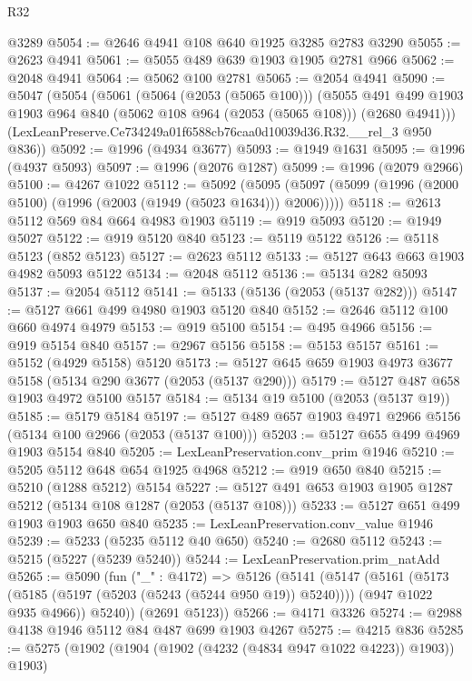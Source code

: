 \begin{lexlean}{R32}
\begin{coremodule}
    @3289
@5054 := @2646 @4941 @108 @640 @1925 @3285 @2783 @3290
@5055 := @2623 @4941
@5061 := @5055 @489 @639 @1903 @1905 @2781 @966
@5062 := @2048 @4941
@5064 := @5062 @100 @2781
@5065 := @2054 @4941
@5090 := @5047
    (@5054
      (@5061
        (@5064 (@2053 (@5065 @100)))
        (@5055
          @491
          @499
          @1903
          @1903
          @964
          @840
          (@5062 @108 @964 (@2053 (@5065 @108)))
          (@2680 @4941)))
      (LexLeanPreserve.Ce734249a01f6588cb76caa0d10039d36.R32.__rel_3 @950 @836))
@5092 := @1996 (@4934 @3677)
@5093 := @1949 @1631
@5095 := @1996 (@4937 @5093)
@5097 := @1996 (@2076 @1287)
@5099 := @1996 (@2079 @2966)
@5100 := @4267 @1022
@5112 := @5092
    (@5095 (@5097 (@5099 (@1996 (@2000 @5100) (@1996 (@2003 (@1949 (@5023 @1634))) @2006)))))
@5118 := @2613 @5112 @569 @84 @664 @4983 @1903
@5119 := @919 @5093
@5120 := @1949 @5027
@5122 := @919 @5120 @840
@5123 := @5119 @5122
@5126 := @5118 @5123 (@852 @5123)
@5127 := @2623 @5112
@5133 := @5127 @643 @663 @1903 @4982 @5093 @5122
@5134 := @2048 @5112
@5136 := @5134 @282 @5093
@5137 := @2054 @5112
@5141 := @5133 (@5136 (@2053 (@5137 @282)))
@5147 := @5127 @661 @499 @4980 @1903 @5120 @840
@5152 := @2646 @5112 @100 @660 @4974 @4979
@5153 := @919 @5100
@5154 := @495 @4966
@5156 := @919 @5154 @840
@5157 := @2967 @5156
@5158 := @5153 @5157
@5161 := @5152 (@4929 @5158) @5120
@5173 := @5127 @645 @659 @1903 @4973 @3677 @5158 (@5134 @290 @3677 (@2053 (@5137 @290)))
@5179 := @5127 @487 @658 @1903 @4972 @5100 @5157
@5184 := @5134 @19 @5100 (@2053 (@5137 @19))
@5185 := @5179 @5184
@5197 := @5127 @489 @657 @1903 @4971 @2966 @5156 (@5134 @100 @2966 (@2053 (@5137 @100)))
@5203 := @5127 @655 @499 @4969 @1903 @5154 @840
@5205 := LexLeanPreservation.conv_prim @1946
@5210 := @5205 @5112 @648 @654 @1925 @4968
@5212 := @919 @650 @840
@5215 := @5210 (@1288 @5212) @5154
@5227 := @5127 @491 @653 @1903 @1905 @1287 @5212 (@5134 @108 @1287 (@2053 (@5137 @108)))
@5233 := @5127 @651 @499 @1903 @1903 @650 @840
@5235 := LexLeanPreservation.conv_value @1946
@5239 := @5233 (@5235 @5112 @40 @650)
@5240 := @2680 @5112
@5243 := @5215 (@5227 (@5239 @5240))
@5244 := LexLeanPreservation.prim_natAdd
@5265 := @5090
    (fun ("_" : @4172) =>
    @5126
      (@5141
        (@5147
          (@5161
            (@5173 (@5185 (@5197 (@5203 (@5243 (@5244 @950 @19)) @5240))))
            (@947 @1022 @935 @4966))
          @5240))
      (@2691 @5123))
@5266 := @4171 @3326
@5274 := @2988 @4138 @1946 @5112 @84 @487 @699 @1903 @4267
@5275 := @4215 @836
@5285 := @5275 (@1902 (@1904 (@1902 (@4232 (@4834 @947 @1022 @4223)) @1903)) @1903)

\end{coremodule}
\end{lexlean}
